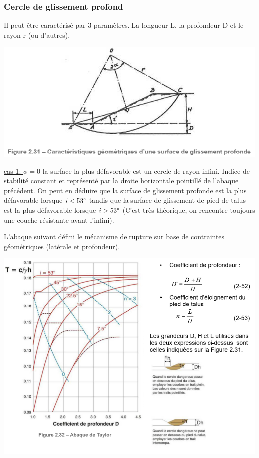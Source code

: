 \subsubsection{Cercle de glissement profond}

Il peut être caractérisé par 3 paramètres. La longueur L, la profondeur D et le rayon r (ou d'autres).

\begin{center}
\includegraphics [scale=0.8]{pictures/231.PNG}
\end{center}

\underline{cas 1: $\phi = 0$} 
la surface la plus défavorable est un cercle de rayon infini. Indice de stabilité constant et représenté par la droite horizontale pointillé de l'abaque précédent. On peut en déduire que la surface de glissement profonde est la plus défavorable lorsque $i<53\degree$ tandis que la surface de glissement de pied de talus est la plus défavorable lorsque $i>53\degree$ (C'est très théorique, on rencontre toujours une couche résistante avant l'infini).

L'abaque suivant défini le mécanisme de rupture sur base de contraintes géométriques (latérale et profondeur).

\begin{center}
\includegraphics [scale=0.8]{pictures/232.PNG}
\end{center}

